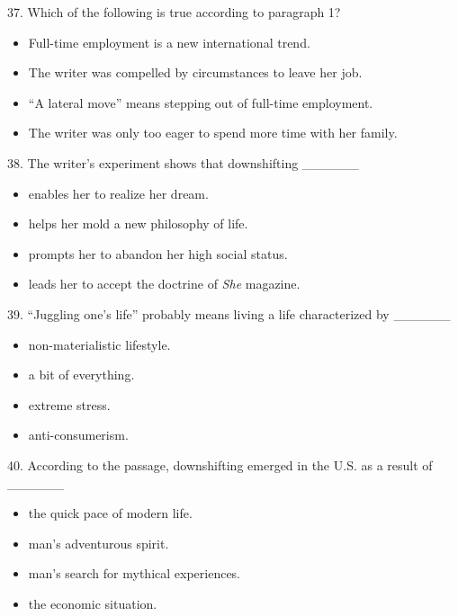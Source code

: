 \documentclass[UTF8,11pt]{ctexart}
\begin{document}
37. Which of the following is true according to paragraph 1?


\begin{itemize}[leftmargin=2em,itemsep=.2em,topsep=.4em]\item[A.] Full-time employment is a new international trend.
\item[B.] The writer was compelled by circumstances to leave her job.
\item[C.] “A lateral move” means stepping out of full-time employment.
\item[D.] The writer was only too eager to spend more time with her family.
\end{itemize}

38. The writer’s experiment shows that downshifting \_\_\_\_\_\_


\begin{itemize}[leftmargin=2em,itemsep=.2em,topsep=.4em]\item[A.] enables her to realize her dream.
\item[B.] helps her mold a new philosophy of life.
\item[C.] prompts her to abandon her high social status.
\item[D.] leads her to accept the doctrine of \textit{She} magazine.
\end{itemize}

39. “Juggling one’s life” probably means living a life characterized by \_\_\_\_\_\_


\begin{itemize}[leftmargin=2em,itemsep=.2em,topsep=.4em]\item[A.] non-materialistic lifestyle.
\item[B.] a bit of everything.
\item[C.] extreme stress.
\item[D.] anti-consumerism.
\end{itemize}

40. According to the passage, downshifting emerged in the U.S. as a result of \_\_\_\_\_\_


\begin{itemize}[leftmargin=2em,itemsep=.2em,topsep=.4em]\item[A.] the quick pace of modern life.
\item[B.] man’s adventurous spirit.
\item[C.] man’s search for mythical experiences.
\item[D.] the economic situation.
\end{itemize}
\end{document}
